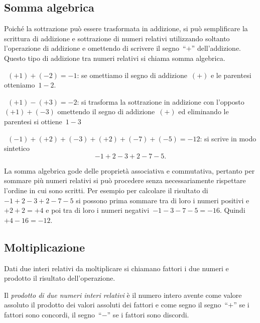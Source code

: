 \subsection{Somma algebrica}

Poiché la sottrazione può essere trasformata in addizione, si può 
semplificare 
la scrittura di addizione
e sottrazione di numeri relativi utilizzando soltanto l'operazione di 
addizione 
e omettendo di scrivere
il segno~``\(+\)'' dell'addizione. Questo tipo di addizione tra numeri 
relativi si 
chiama somma algebrica.

 \begin{esempio}
~\((+1)+(-2)=-1\): se omettiamo il segno di addizione~\((+)\) e le 
parentesi 
otteniamo~\(1-2\).
 \end{esempio}

\begin{esempio}
~\((+1)-(+3)=-2\): si trasforma la sottrazione in addizione con 
l'opposto~\((+1)+(-3)\) omettendo il segno
di addizione~\((+)\) ed eliminando le parentesi si ottiene~\(1-3\)
 \end{esempio}

\begin{esempio}
~\((-1)+(+2)+(-3)+(+2)+(-7)+(-5)=-12\): si scrive in modo sintetico 
\[-1+2-3+2-7-5.\]
 \end{esempio}


La somma algebrica gode delle proprietà associativa e commutativa, pertanto 
per 
sommare più numeri relativi
si può procedere senza necessariamente rispettare l'ordine in cui sono 
scritti. 
Per esempio per calcolare
il risultato di~\(-1+2-3+2-7-5\) si possono prima sommare tra di loro i 
numeri 
positivi e~\(+2+2=+4\)
e poi tra di loro i numeri negativi~\(-1-3-7-5=-16\). Quindi~\(+4-16=-12\).


\subsection{Moltiplicazione}

Dati due interi relativi da moltiplicare si chiamano fattori i due numeri e 
prodotto il
risultato dell'operazione.

Il \emph{prodotto di due numeri interi relativi} è il numero intero avente 
come 
valore assoluto il prodotto
dei valori assoluti dei fattori e come segno il segno~``\(+\)'' se i 
fattori sono 
concordi,
il segno~``\(-\)'' se i fattori sono discordi.

